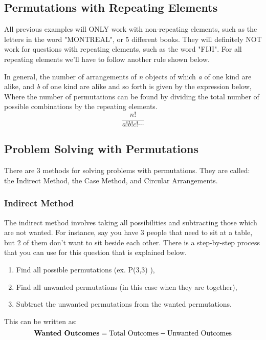     \subsection{Permutations with Repeating Elements}
    All previous examples will ONLY work with non-repeating elements, such as the letters in the word "MONTREAL", or 5 different books.
    They will definitely NOT work for questions with repeating elements, such as the word "FIJI".
    For all repeating elements we'll have to follow another rule shown below.
    \begin{definition}
        In general, the number of arrangements of \emph{n} objects of which \emph{a} of one kind are alike, and \emph{b} of one kind are alike and so forth is given by the expression below, Where the number of permutations can be found by dividing the total number of possible combinations by the repeating elements.
        \begin{equation*}
            \frac{n!}{a!b!c!\cdots}
        \end{equation*}
    \end{definition}
    
    \subsection{Problem Solving with Permutations}
    There are 3 methods for solving problems with permutations. They are called: the Indirect Method, the Case Method, and Circular Arrangements.
    
        \subsubsection{Indirect Method}
        The indirect method involves taking all possibilities and subtracting those which are not wanted.
        For instance, say you have 3 people that need to sit at a table, but 2 of them don't want to sit beside each other.
        There is a step-by-step process that you can use for this question that is explained below.
        \begin{enumerate}
                \item Find all possible permutations (ex. P(3,3) ),
                \item Find all unwanted permutations (in this case when they are together),
                \item Subtract the unwanted permutations from the wanted permutations.
            \end{enumerate}
        This can be written as:
        \begin{equation*}
            \mbox{\textbf{Wanted Outcomes}} = \mbox{Total Outcomes}-\mbox{Unwanted Outcomes}
        \end{equation*}
    
